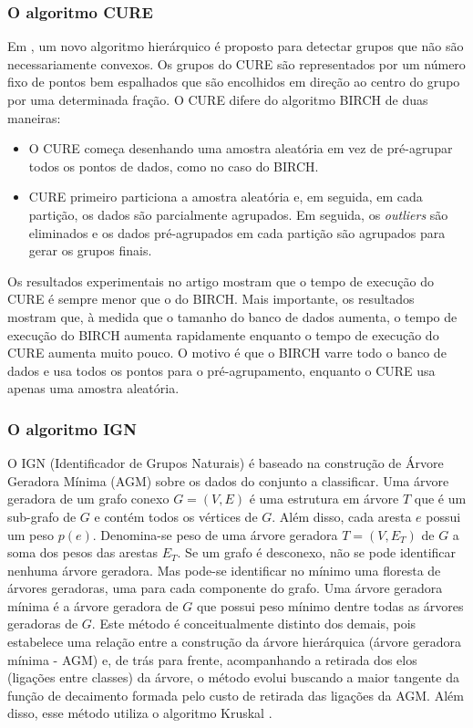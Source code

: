 \subsubsection{O algoritmo CURE}
Em \cite{Guha1998}, um novo algoritmo hierárquico é proposto para detectar grupos que não são necessariamente convexos. Os grupos do CURE são representados por um número fixo de pontos bem espalhados que são encolhidos em direção ao centro do grupo por uma determinada fração. O CURE difere do algoritmo BIRCH de duas maneiras:
\begin{itemize}
\item O CURE começa desenhando uma amostra aleatória em vez de pré-agrupar todos os pontos de dados, como no caso do BIRCH.
\item CURE primeiro particiona a amostra aleatória e, em seguida, em cada partição, os dados são parcialmente agrupados. Em seguida, os \textit{outliers} são eliminados e os dados pré-agrupados em cada partição são agrupados para gerar os grupos finais.
\end{itemize}
Os resultados experimentais no artigo mostram que o tempo de execução do CURE é sempre menor que o do BIRCH. Mais importante, os resultados mostram que, à medida que o tamanho do banco de dados aumenta, o tempo de execução do BIRCH aumenta rapidamente enquanto o tempo de execução do CURE aumenta muito pouco. O motivo é que o BIRCH varre todo o banco de dados e usa todos os pontos para o pré-agrupamento, enquanto o CURE usa apenas uma amostra aleatória.


\subsubsection{O algoritmo IGN}
O IGN (Identificador de Grupos Naturais) \cite{ign} é baseado na construção de Árvore Geradora Mínima (AGM) sobre os dados do conjunto a classificar. Uma árvore geradora de um grafo conexo ${G = (V, E)}$ é uma estrutura em árvore ${T}$ que é um sub-grafo de ${G}$ e contém todos os vértices de ${G}$. Além disso, cada aresta ${e}$ possui um peso ${p(e)}$. Denomina-se peso de uma árvore geradora ${T=(V,E_T)}$ de ${G}$ a soma dos pesos das arestas ${E_T}$. Se um grafo é desconexo, não se pode identificar nenhuma árvore geradora. Mas pode-se identificar no mínimo uma floresta de árvores geradoras, uma para cada componente do grafo. Uma árvore geradora mínima é a árvore geradora de ${G}$ que possui peso mínimo dentre todas as árvores geradoras de ${G}$.
Este método é conceitualmente distinto dos demais, pois estabelece uma relação entre a construção da árvore hierárquica (árvore geradora mínima - AGM) e, de trás para frente, acompanhando a retirada dos elos (ligações entre classes) da árvore, o método evolui buscando a maior tangente da função de decaimento formada pelo custo de retirada das ligações da AGM. Além disso, esse método utiliza o algoritmo Kruskal \cite{kruskal}.

